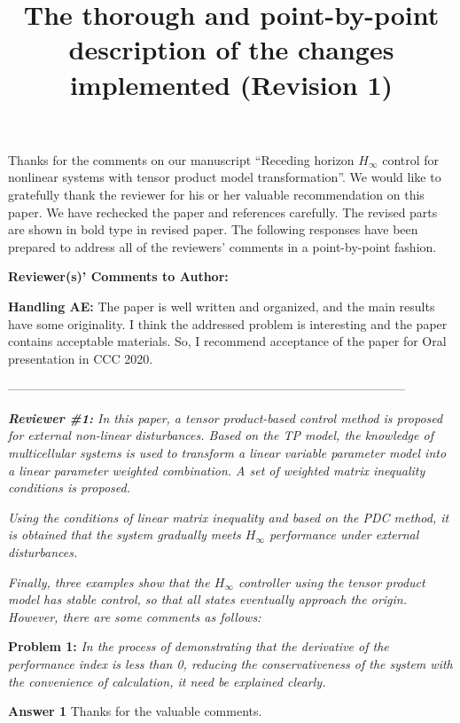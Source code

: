 \documentclass[a4paper]{article}
\begin{document}
\pagestyle{plain}
\title{The thorough and point-by-point description of the changes implemented (Revision 1)}
\maketitle

Thanks for the comments on our manuscript ``Receding horizon $H_{\infty}$ control for nonlinear systems with tensor product model transformation''.  We would like to gratefully thank the reviewer for his or her valuable recommendation on this paper. We have rechecked the paper and references carefully. \textcolor[rgb]{1,0,0}{The revised parts are shown in bold type in revised paper}. The following responses have been prepared to address all of the reviewers' comments in a point-by-point fashion.
\vskip 0.3cm

\textbf{Reviewer(s)' Comments to Author:}

\textbf{Handling AE:} The paper is well written and organized, and the main results have some originality. I think the addressed problem is interesting and the paper contains acceptable materials. So, I recommend acceptance of the paper for Oral presentation in CCC 2020.

------------------------------------------------------------------------------------------------

\textit{\textbf{Reviewer \#1:} In this paper, a tensor product-based control method is proposed for external non-linear disturbances. Based on the TP model, the knowledge of multicellular systems is used to transform a linear variable parameter model into a linear parameter weighted combination. A set of weighted matrix inequality conditions is proposed. }

\textit{Using the conditions of linear matrix inequality and based on the PDC method, it is obtained that the system gradually meets $H_{\infty}$ performance under external disturbances. }

\textit{Finally, three examples show that the $H_{\infty}$ controller using the tensor product model has stable control, so that all states eventually approach the origin. However, there are some comments as follows:}

\textbf{Problem 1:} \textit{In the process of demonstrating that the derivative of the performance index is less than 0, reducing the conservativeness of the system with the convenience of calculation, it need be explained clearly.}

\textbf{Answer 1} Thanks for the valuable comments.
\end{document}
